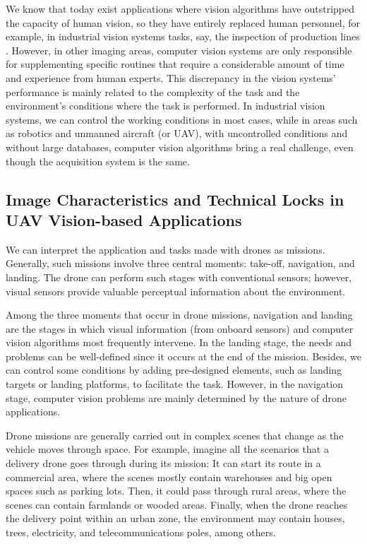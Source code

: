 We know that today exist applications where vision algorithms have outstripped the capacity of human vision, so they have entirely replaced human personnel, for example, in industrial vision systems tasks, say, the inspection of production lines \citep{Malamas.Petrakis.ea:IVC:2003}. However, in other imaging areas, computer vision systems are only responsible for supplementing specific routines that require a considerable amount of time and experience from human experts. This discrepancy in the vision systems' performance is mainly related to the complexity of the task and the environment's conditions where the task is performed. In industrial vision systems, we can control the working conditions in most cases, while in areas such as robotics and unmanned aircraft (or UAV), with uncontrolled conditions and without large databases, computer vision algorithms bring a real challenge, even though the acquisition system is the same. 

\subsection*{Image Characteristics and Technical Locks in UAV Vision-based Applications}
 
We can interpret the application and tasks made with drones as missions. Generally, such missions involve three central moments: take-off, navigation, and landing. The drone can perform such stages with conventional sensors; however, visual sensors provide valuable perceptual information about the environment.

Among the three moments that occur in drone missions, navigation and landing are the stages in which visual information (from onboard sensors) and computer vision algorithms most frequently intervene. In the landing stage, the needs and problems can be well-defined since it occurs at the end of the mission. Besides, we can control some conditions by adding pre-designed elements, such as landing targets or landing platforms, to facilitate the task. However, in the navigation stage, computer vision problems are mainly determined by the nature of drone applications.

Drone missions are generally carried out in complex scenes that change as the vehicle moves through space. For example, imagine all the scenarios that a delivery drone goes through during its mission: It can start its route in a commercial area, where the scenes mostly contain warehouses and big open spaces such as parking lots. Then, it could pass through rural areas, where the scenes can contain farmlands or wooded areas. Finally, when the drone reaches the delivery point within an urban zone, the environment may contain houses, trees, electricity, and telecommunications poles, among others. 

